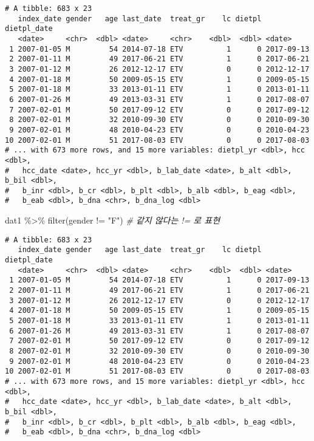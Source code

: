 \documentclass[
]{article}
\newenvironment{Shaded}{\begin{snugshade}}{\end{snugshade}}
\newcommand{\CommentTok}[1]{\textcolor[rgb]{0.56,0.35,0.01}{\textit{#1}}}
\newcommand{\FunctionTok}[1]{\textcolor[rgb]{0.00,0.00,0.00}{#1}}
\newcommand{\NormalTok}[1]{#1}
\newcommand{\SpecialCharTok}[1]{\textcolor[rgb]{0.00,0.00,0.00}{#1}}
\newcommand{\StringTok}[1]{\textcolor[rgb]{0.31,0.60,0.02}{#1}}
\begin{document}
\begin{verbatim}
# A tibble: 683 x 23
   index_date gender   age last_date  treat_gr    lc dietpl dietpl_date
   <date>     <chr>  <dbl> <date>     <chr>    <dbl>  <dbl> <date>     
 1 2007-01-05 M         54 2014-07-18 ETV          1      0 2017-09-13 
 2 2007-01-11 M         49 2017-06-21 ETV          1      0 2017-06-21 
 3 2007-01-12 M         26 2012-12-17 ETV          0      0 2012-12-17 
 4 2007-01-18 M         50 2009-05-15 ETV          1      0 2009-05-15 
 5 2007-01-18 M         33 2013-01-11 ETV          1      0 2013-01-11 
 6 2007-01-26 M         49 2013-03-31 ETV          1      0 2017-08-07 
 7 2007-02-01 M         50 2017-09-12 ETV          0      0 2017-09-12 
 8 2007-02-01 M         32 2010-09-30 ETV          0      0 2010-09-30 
 9 2007-02-01 M         48 2010-04-23 ETV          0      0 2010-04-23 
10 2007-02-01 M         51 2017-08-03 ETV          0      0 2017-08-03 
# ... with 673 more rows, and 15 more variables: dietpl_yr <dbl>, hcc <dbl>,
#   hcc_date <date>, hcc_yr <dbl>, b_lab_date <date>, b_alt <dbl>, b_bil <dbl>,
#   b_inr <dbl>, b_cr <dbl>, b_plt <dbl>, b_alb <dbl>, b_eag <dbl>,
#   b_eab <dbl>, b_dna <chr>, b_dna_log <dbl>
\end{verbatim}

\begin{Shaded}
\begin{Highlighting}[]
\NormalTok{dat1 }\SpecialCharTok{\%\textgreater{}\%} 
   \FunctionTok{filter}\NormalTok{(gender }\SpecialCharTok{!=} \StringTok{"F"}\NormalTok{) }\CommentTok{\# 같지 않다는 != 로 표현}
\end{Highlighting}
\end{Shaded}

\begin{verbatim}
# A tibble: 683 x 23
   index_date gender   age last_date  treat_gr    lc dietpl dietpl_date
   <date>     <chr>  <dbl> <date>     <chr>    <dbl>  <dbl> <date>     
 1 2007-01-05 M         54 2014-07-18 ETV          1      0 2017-09-13 
 2 2007-01-11 M         49 2017-06-21 ETV          1      0 2017-06-21 
 3 2007-01-12 M         26 2012-12-17 ETV          0      0 2012-12-17 
 4 2007-01-18 M         50 2009-05-15 ETV          1      0 2009-05-15 
 5 2007-01-18 M         33 2013-01-11 ETV          1      0 2013-01-11 
 6 2007-01-26 M         49 2013-03-31 ETV          1      0 2017-08-07 
 7 2007-02-01 M         50 2017-09-12 ETV          0      0 2017-09-12 
 8 2007-02-01 M         32 2010-09-30 ETV          0      0 2010-09-30 
 9 2007-02-01 M         48 2010-04-23 ETV          0      0 2010-04-23 
10 2007-02-01 M         51 2017-08-03 ETV          0      0 2017-08-03 
# ... with 673 more rows, and 15 more variables: dietpl_yr <dbl>, hcc <dbl>,
#   hcc_date <date>, hcc_yr <dbl>, b_lab_date <date>, b_alt <dbl>, b_bil <dbl>,
#   b_inr <dbl>, b_cr <dbl>, b_plt <dbl>, b_alb <dbl>, b_eag <dbl>,
#   b_eab <dbl>, b_dna <chr>, b_dna_log <dbl>
\end{verbatim}
\end{document}
